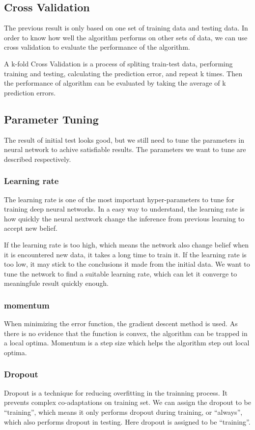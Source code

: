 \documentclass[format=acmsmall,review=false, screen=true, authorversion=true]{acmart}
\begin{document}
\subsection{Cross Validation}
 The previous result is only based on one set of training data and testing data. In order to know how well the algorithm performs on other sets of data, we can use cross validation to evaluate the performance of the algorithm. 
 
A k-fold Cross Validation is a process of spliting train-test data, performing training and testing, calculating the prediction error, and repeat k times. Then the performance of algorithm can be evaluated by taking the average of k prediction errors. 

\subsection{Parameter Tuning}
The result of initial test looks good, but we still need to tune the parameters in neural network to achive satisfiable results. The parameters we want to tune are described respectively. 
\subsubsection{Learning rate}
The learning rate is one of the most important hyper-parameters to tune for training deep neural networks. In a easy way to understand, the learning rate is how quickly the neural nextwork change the inference from previous learning to accept new belief. 

If the learning rate is too high, which means the network also change belief when it is encountered new data, it takes a long time to train it. If the learning rate is too low, it may stick to the conclusions it made from the initial data. We want to tune the network to find a suitable learning rate, which can let it converge to meaningfule result quickly enough.   

\subsubsection{momentum}
When minimizing the error function, the gradient descent method is used. As there is no evidence that the function is convex, the algorithm can be trapped in a local optima. Momentum is a step size which helps the algorithm step out local optima.

\subsubsection{Dropout}
Dropout is a technique for reducing overfitting in the trainning process. It prevents complex co-adaptations on training set. We can assign the dropout to be ``training'', which means it only performs dropout during training, or ``always'', which also performs dropout in testing. Here dropout is assigned to be ``training''. 
\end{document}
